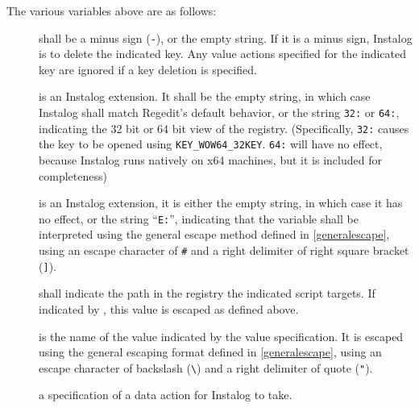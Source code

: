 The various variables above are as follows:
\begin{description}
\item[] shall be a minus sign (\verb|-|), or the empty string.
If it is a minus sign, Instalog is to delete the indicated key. Any value
actions specified for the indicated key are ignored if a key deletion is
specified.
\item[] is an Instalog extension. It shall be the empty string, in
which case Instalog shall match Regedit's default behavior, or the string
\verb|32:| or \verb|64:|, indicating the 32 bit or 64 bit view of the registry.
(Specifically, \verb|32:| causes the key to be opened using
\verb|KEY_WOW64_32KEY|. \verb|64:| will have no effect, because Instalog runs
natively on x64 machines, but it is included for completeness)
\item[] is an Instalog extension, it is either the empty string,
in which case it has no effect, or the string ``\verb|E:|'', indicating that the
 variable shall be interpreted using the general escape method
defined in \ref{generalescape}, using an escape character of \verb|#| and a
right delimiter of right square bracket (\verb|]|).
\item[] shall indicate the path in the registry the indicated
script targets. If indicated by , this value is escaped as
defined above.
\item[] is the name of the value indicated by the value
specification. It is escaped using the general escaping format defined in
\ref{generalescape}, using an escape character of backslash (\verb|\|) and a
right delimiter of quote (\verb|"|).
\item[] a specification of a data action for Instalog to take.
\end{description}

